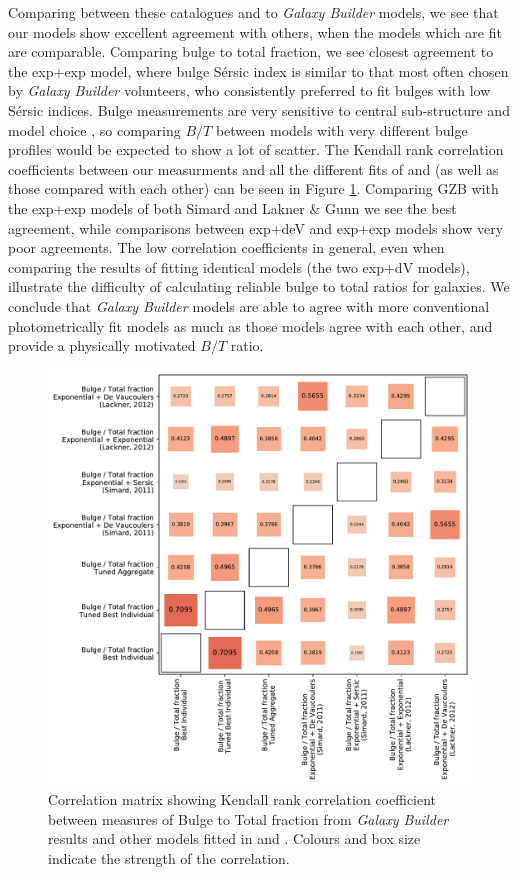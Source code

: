 \documentclass[../main.tex]{subfiles}
\begin{document}
Comparing between these catalogues and to \textit{Galaxy Builder} models, we see that our models show excellent agreement with others, when the models which are fit are comparable. Comparing bulge to total fraction, we see closest agreement to the exp+exp model, where bulge S\'ersic index is similar to that most often chosen by \textit{Galaxy Builder} volunteers, who consistently preferred to fit bulges with low S\'ersic indices. Bulge measurements are very sensitive to central sub-structure and model choice \citep{Gao2017:1709.00746v1}, so comparing $B/T$ between models with very different bulge profiles would be expected to show a lot of scatter. The Kendall rank correlation coefficients between our measurments and all the different fits of \citet{2011ApJS..196...11S} and \citet{2012MNRAS.421.2277L} (as well as those compared with each other) can be seen in Figure \ref{fig:bt_correlation}. Comparing GZB with the exp+exp models of both Simard and Lakner \& Gunn we see the best agreement, while comparisons between exp+deV and exp+exp models show very poor agreements. The low correlation coefficients in general, even when comparing the results of fitting identical models (the two exp+dV models), illustrate the difficulty of calculating reliable bulge to total ratios for galaxies. We conclude that \textit{Galaxy Builder} models are able to agree with more conventional photometrically fit models as much as those models agree with each other, and provide a physically motivated $B/T$ ratio.

\begin{figure}
  \includegraphics[width=17cm]{images__results/b-t_comparison_correlation.pdf}
  \caption{Correlation matrix showing Kendall rank correlation coefficient between measures of Bulge to Total fraction from \textit{Galaxy Builder} results and other models fitted in \citet{2011ApJS..196...11S} and \citet{2012MNRAS.421.2277L}. Colours and box size indicate the strength of the correlation.}
  \label{fig:bt_correlation}
\end{figure}
\end{document}
